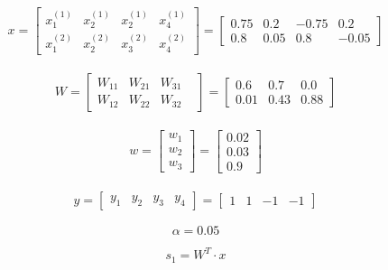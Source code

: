 \documentclass[a4paper]{article}
\begin{document}
\begin{gather}
x = 
 \begin{bmatrix} x_1^{(1)} & x_2^{(1)} & x_2^{(1)} & x_4^{(1)} \\ x_1^{(2)} & x_2^{(2)} & x_3^{(2)} & x_4^{(2)} \end{bmatrix}
 =
 \begin{bmatrix} 0.75 & 0.2 & -0.75 & 0.2 \\ 0.8 & 0.05 & 0.8 & -0.05 \end{bmatrix}
 \nonumber 
\end{gather}

\begin{gather}
W = 
 \begin{bmatrix} W_{11} & W_{21} & W_{31} \\ W_{12} & W_{22} & W_{32} &\end{bmatrix}
 =
 \begin{bmatrix} 0.6 & 0.7 & 0.0 \\ 0.01 & 0.43 & 0.88 \end{bmatrix}
 \nonumber 
\end{gather}

\begin{gather}
w = 
 \begin{bmatrix} w_{1}  \\ w_{2} \\ w_{3}\end{bmatrix}
 \nonumber 
  =
 \begin{bmatrix} 0.02 \\ 0.03 \\ 0.9 \end{bmatrix}
\end{gather}

\begin{gather}
y = 
 \begin{bmatrix} y_1  & y_2 & y_3 & y_4 \end{bmatrix}
 \nonumber 
  = 
 \begin{bmatrix} 1 & 1 & -1 & -1 \end{bmatrix}
\end{gather}

\begin{equation}
\alpha = 0.05
\nonumber \end{equation}


\begin{equation}
s_1 = W^T \cdot x
\end{equation}
\end{document}
